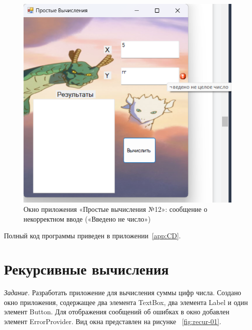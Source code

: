 \documentclass[bachelor, och, pract, times]{SCWorks}
\begin{document}
\begin{figure}[H]
    \centering
    \includegraphics[scale=0.7]{Скрины/Снимок экрана 2025-01-03 215325.png}
    \caption{Окно приложения «Простые вычисления №12»: сообщение о некорректном вводе
(«Введено не число»)}\label{fig:simple-05}
\end{figure}

Полный код программы приведен в приложении~\ref{app:CD}.


\section{Рекурсивные вычисления}

\textsl{Задание.} Разработать приложение для вычисления суммы цифр числа.
Создано окно приложения, содержащее два элемента TextBox, два элемента Label и один элемент Button. Для отображения сообщений об ошибках в окно
добавлен элемент ErrorProvider. Вид окна представлен на рисунке ~\ref{fig:recur-01}.
\end{document}
